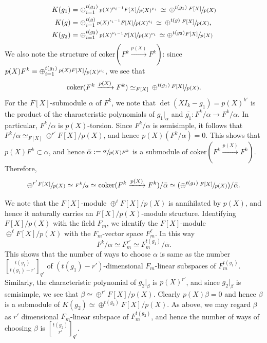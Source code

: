 \documentclass[reqno]{amsart}
\theoremstyle{definition}
\theoremstyle{remark}
\numberwithin{equation}{section}
\newcommand{\stirling}[2]{\genfrac{[}{]}{0pt}{1}{#1}{#2}}
\begin{document}
\begin{align*} 
K(g_1) &=\oplus_{i=1}^{t(g_1)} \,  \sfrac{p(X)^{\mu_i-1} F[X]}{p(X)^{\mu_i}}  \,  \simeq \, \oplus^{t(g_1)} \, \sfrac{F[X]}{p(X)} \\
K(g) &= \oplus_{i=1}^{t(g)}\,  \sfrac{p(X)^{\epsilon_i-1} F[X]}{p(X)^{\epsilon_i}}  \,   \simeq\,   \oplus^{t(g)} \, \sfrac{F[X]}{p(X)},\\
K(g_2) &= \oplus_{i=1}^{t(g_2)} \,   \sfrac{p(X)^{\nu_i-1}F[X]}{p(X)^{\nu_i}} \, \simeq \oplus^{t(g_2)} \sfrac{F[X]}{p(X)}
\end{align*}
We also note the structure of  coker$(F^k \xrightarrow{p(X)} F^k)$: since $p(X) F^k = \oplus_{i=1}^{t(g_1)} \,  \sfrac{p(X)  F[X]}{p(X)^{\mu_i}}$, we see that 
\[ \text{coker}(F^k \xrightarrow{p(X)} F^k) \simeq_{F[X]} \,   \oplus^{t(g_1)} \, \sfrac{F[X]}{p(X)}.     \]
For the  $F[X]$-submodule $\alpha$ of $F^k$, we note that $\det(XI_k - g_1)=p(X)^{k'}$ is the product of the characteristic polynomials of $g_1|_\alpha$ and $\bar{g_1}:F^k/\alpha \to F^k/\alpha$. In particular,  $F^k/\alpha$ is $p(X)$-torsion. Since $F^k/\alpha$ is semisimple, it follows that $F^k/\alpha \simeq_{F[X]} \oplus^{r'} F[X]/p(X)$,  and hence $p(X) (F^k/\alpha)=0$. This shows that $p(X) F^k \subset \alpha$, and hence $\bar{\alpha}:=\sfrac{\alpha}{p(X)F^k}$ is a submodule of $\text{coker}(F^k \xrightarrow{p(X)} F^k)$. Therefore, 
\[ \oplus^{r'} \sfrac{F[X]}{p(X)} \simeq \sfrac{F^k}{\alpha} \simeq \text{coker}(F^k \xrightarrow{p(X)} F^k)/\bar\alpha  \simeq (\oplus^{t(g_1)} \, \sfrac{F[X]}{p(X)})/\bar{\alpha}. \]

We note that the $F[X]$-module $\oplus^{\ell} F[X]/p(X)$ is annihilated by $p(X)$, and hence it naturally carries an  $F[X]/p(X)$-module structure. Identifying $F[X]/p(X)$ with the field $F_m$, we identify the $F[X]$-module $\oplus^{\ell} F[X]/p(X)$ with the $F_m$-vector space $F_m^\ell$. In this way 
\[F^k/\alpha \simeq F_m^{r'} \simeq F_m^{t(g_1)}/\bar\alpha. \]
This shows that the number of ways to choose $\alpha$ is same as the number $\stirling{t(g_1)}{t(g_1)-r'}_{q'}$ of $(t(g_1)-r')$-dimensional $F_m$-linear subspaces  of $F_m^{t(g_1)}$.\\





Similarly, the characteristic polynomial of $g_2|_\beta$ is $p(X)^{r'}$, and since $g_2|_\beta$ is semisimple, we see that $\beta \simeq \oplus^{r'} F[X]/p(X)$. Clearly $p(X) \beta=0$ and hence $\beta$ is a submodule of $K(g_2) \simeq \oplus^{t(g_2)} F[X]/p(X)$.
As above, we may regard $\beta$ as $r'$ dimensional $F_m$-linear subspace of $F_m^{t(g_2)}$, and hence the number of ways of choosing $\beta$ is $\stirling{t(g_2)}{r'}_{q'}$.\\
\end{document}
